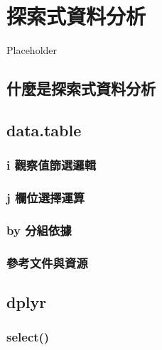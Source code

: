 \documentclass[
]{book}
\begin{document}
\hypertarget{eda}{%
\chapter{探索式資料分析}\label{eda}}

Placeholder

\hypertarget{ux4ec0ux9ebcux662fux63a2ux7d22ux5f0fux8cc7ux6599ux5206ux6790}{%
\section{什麼是探索式資料分析}\label{ux4ec0ux9ebcux662fux63a2ux7d22ux5f0fux8cc7ux6599ux5206ux6790}}

\hypertarget{datatable}{%
\section{data.table}\label{datatable}}

\hypertarget{i-ux89c0ux5bdfux503cux7be9ux9078ux908fux8f2f}{%
\subsection{i 觀察值篩選邏輯}\label{i-ux89c0ux5bdfux503cux7be9ux9078ux908fux8f2f}}

\hypertarget{j-ux6b04ux4f4dux9078ux64c7ux904bux7b97}{%
\subsection{j 欄位選擇運算}\label{j-ux6b04ux4f4dux9078ux64c7ux904bux7b97}}

\hypertarget{by-ux5206ux7d44ux4f9dux64da}{%
\subsection{by 分組依據}\label{by-ux5206ux7d44ux4f9dux64da}}

\hypertarget{ux53c3ux8003ux6587ux4ef6ux8207ux8cc7ux6e90}{%
\subsection{參考文件與資源}\label{ux53c3ux8003ux6587ux4ef6ux8207ux8cc7ux6e90}}

\hypertarget{dplyr}{%
\section{dplyr}\label{dplyr}}

\hypertarget{select}{%
\subsection{select()}\label{select}}
\end{document}
